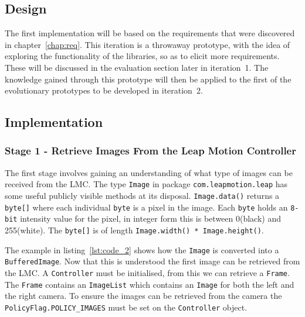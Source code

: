 \documentclass[11pt,oneside]{report}
\newcommand\code[1]{\texttt{#1}}
\begin{document}
		\subsection{Design}
		The first implementation will be based on the requirements that were discovered in chapter~\ref{chap:req}.
		This iteration is a throwaway prototype, with the idea of exploring the functionality of the libraries, so as to elicit more requirements.
		These will be discussed in the evaluation section later in iteration~1.
		The knowledge gained through this prototype will then be applied to the first of the evolutionary prototypes to be developed in iteration~2.
		\subsection{Implementation}
		\subsubsection{Stage 1 - Retrieve Images From the Leap Motion Controller}
		The first stage involves gaining an understanding of what type of images can be received from the LMC.
		The type \code{Image} in package \code{com.leapmotion.leap} has some useful publicly visible methods at its disposal.
		\code{Image.data()} returns a \code{byte[]} where each individual \code{byte} is a pixel in the image.
		Each \code{byte} holds an \code{8-bit} intensity value for the pixel, in integer form this is between 0(black) and 255(white).
		The \code{byte[]} is of length \code{Image.width() * Image.height()}.
		
		The example in listing~\ref{lst:code_2} shows how the \code{Image} is converted into a \code{BufferedImage}.
		Now that this is understood the first image can be retrieved from the LMC.
		A \code{Controller} must be initialised, from this we can retrieve a \code{Frame}.
		The \code{Frame} contains an \code{ImageList} which contains an \code{Image} for both the left and the right camera.
		To ensure the images can be retrieved from the camera the \code{PolicyFlag.POLICY\_IMAGES} must be set on the \code{Controller} object.
		
\end{document}
